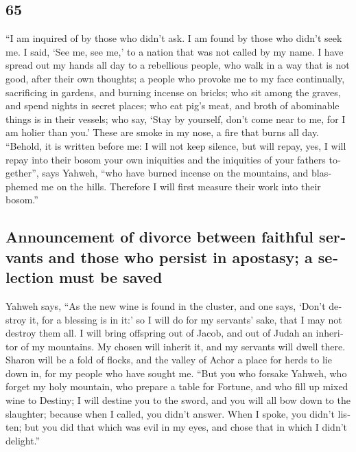 \begin{paracol}{2}
\begin{otherlanguage}{english}
\hypertarget{section-129}{%
\section{65}\label{section-129}}

 ``I am inquired of by those who didn't ask. I am found by
those who didn't seek me. I said, `See me, see me,' to a nation that was
not called by my name.  I have spread out my hands all day
to a rebellious people, who walk in a way that is not good, after their
own thoughts;  a people who provoke me to my face
continually, sacrificing in gardens, and burning incense on bricks;
 who sit among the graves, and spend nights in secret
places; who eat pig's meat, and broth of abominable things is in their
vessels;  who say, `Stay by yourself, don't come near to
me, for I am holier than you.' These are smoke in my nose, a fire that
burns all day.  ``Behold, it is written before me: I will
not keep silence, but will repay, yes, I will repay into their bosom
 your own iniquities and the iniquities of your fathers
together'', says Yahweh, ``who have burned incense on the mountains, and
blasphemed me on the hills. Therefore I will first measure their work
into their bosom.''

\hypertarget{announcement-of-divorce-between-faithful-servants-and-those-who-persist-in-apostasy-a-selection-must-be-saved}{%
\subsection{Announcement of divorce between faithful servants and those
who persist in apostasy; a selection must be
saved}\label{announcement-of-divorce-between-faithful-servants-and-those-who-persist-in-apostasy-a-selection-must-be-saved}}

 Yahweh says, ``As the new wine is found in the cluster,
and one says, `Don't destroy it, for a blessing is in it:' so I will do
for my servants' sake, that I may not destroy them all.  I
will bring offspring out of Jacob, and out of Judah an inheritor of my
mountains. My chosen will inherit it, and my servants will dwell there.
 Sharon will be a fold of flocks, and the valley of Achor
a place for herds to lie down in, for my people who have sought me.
 ``But you who forsake Yahweh, who forget my holy
mountain, who prepare a table for Fortune, and who fill up mixed wine to
Destiny;  I will destine you to the sword, and you will
all bow down to the slaughter; because when I called, you didn't answer.
When I spoke, you didn't listen; but you did that which was evil in my
eyes, and chose that in which I didn't delight.''


\end{otherlanguage}
\end{paracol}
